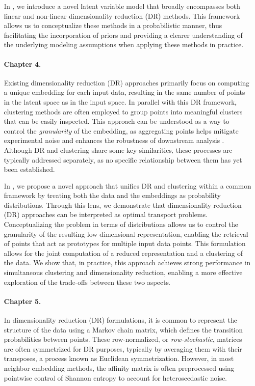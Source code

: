 In , we introduce a novel latent variable model that broadly encompasses both linear and non-linear dimensionality reduction (DR) methods. This framework allows us to conceptualize these methods in a probabilistic manner, thus facilitating the incorporation of priors and providing a clearer understanding of the underlying modeling assumptions when applying these methods in practice.

\paragraph{Chapter 4.}  
Existing dimensionality reduction (DR) approaches primarily focus on computing a unique embedding for each input data, resulting in the same number of points in the latent space as in the input space. In parallel with this DR framework, clustering methods are often employed to group points into meaningful clusters that can be easily inspected. This approach can be understood as a way to control the \emph{granularity} of the embedding, as aggregating points helps mitigate experimental noise and enhances the robustness of downstream analysis \citep{persad2023seacells}. Although DR and clustering share some key similarities, these processes are typically addressed separately, as no specific relationship between them has yet been established.

In , we propose a novel approach that unifies DR and clustering within a common framework by treating both the data and the embeddings as probability distributions. Through this lens, we demonstrate that dimensionality reduction (DR) approaches can be interpreted as optimal transport problems. Conceptualizing the problem in terms of distributions allows us to control the granularity of the resulting low-dimensional representation, enabling the retrieval of points that act as prototypes for multiple input data points. This formulation allows for the joint computation of a reduced representation and a clustering of the data. We show that, in practice, this approach achieves strong performance in simultaneous clustering and dimensionality reduction, enabling a more effective exploration of the trade-offs between these two aspects.

\paragraph{Chapter 5.}  
In dimensionality reduction (DR) formulations, it is common to represent the structure of the data using a Markov chain matrix, which defines the transition probabilities between points. These row-normalized, or \emph{row-stochastic}, matrices are often symmetrized for DR purposes, typically by averaging them with their transposes, a process known as Euclidean symmetrization. However, in most neighbor embedding methods, the affinity matrix is often preprocessed using pointwise control of Shannon entropy to account for heteroscedastic noise.

